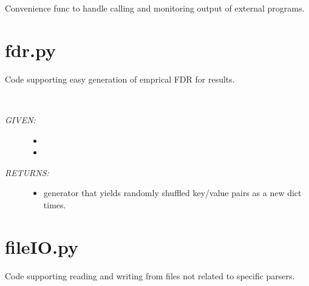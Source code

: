 \documentclass[letterpaper,10pt,english]{sphinxmanual}
\begin{document}

\begin{fulllineitems}
\label{code:gfunc.externals.runExternalApp}
Convenience func to handle calling and monitoring output of external programs.

\end{fulllineitems}

\label{code:module-gfunc.fdr}

\section{fdr.py}
\label{code:fdr-py}
Code supporting easy generation of emprical FDR for results.

\begin{fulllineitems}
\label{code:gfunc.fdr.shuffle_dict}~\begin{description}
\item[{\emph{GIVEN:}}] \leavevmode\begin{itemize}
\item {} 

\item {} 

\end{itemize}

\item[{\emph{RETURNS:}}] \leavevmode\begin{itemize}
\item {} 
generator that yields randomly shuffled key/value pairs as a new dict  times.

\end{itemize}

\end{description}

\end{fulllineitems}

\label{code:module-gfunc.fileIO}

\section{fileIO.py}
\label{code:fileio-py}
Code supporting reading and writing from files not related to specific parsers.
\end{document}
